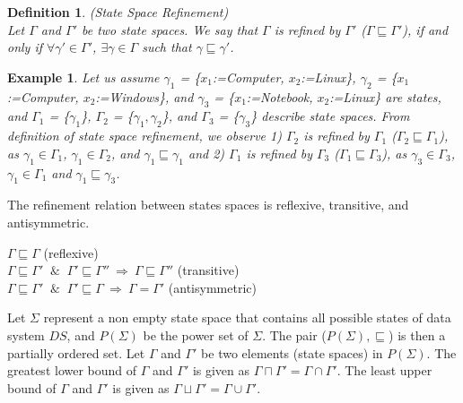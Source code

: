 \documentclass[12pt,journal,letterpaper,onecolumn]{IEEEtran}
\newtheorem{definition}{Definition}[section]
\newtheorem{example}{Example}[section]
\begin{document}
\begin{definition}(State Space Refinement)\\
Let $\Gamma$ and $\Gamma'$ be two state spaces. We say that $\Gamma$
is refined by $\Gamma'$ ($\Gamma \sqsubseteq \Gamma'$), if and only
if $\forall \gamma' \in \Gamma'$,  $\exists \gamma \in \Gamma$
such that $\gamma \sqsubseteq \gamma'$.
\label{def:statespacerefinement}
\end{definition}


\begin{example}
Let us assume $\gamma_1$ = \{$x_1$:={\ttfamily Computer}, $x_2$:={\ttfamily Linux}\},
     $\gamma_2$ = \{$x_1$:={\ttfamily Computer}, $x_2$:={\ttfamily Windows}\}, and
     $\gamma_3$ = \{$x_1$:={\ttfamily Notebook}, $x_2$:={\ttfamily Linux}\} are states, and $\Gamma_1$ = \{$\gamma_1$\},
     $\Gamma_2$ = \{$\gamma_1, \gamma_2$\}, and
     $\Gamma_3$ = \{$\gamma_3$\} describe state spaces.
From definition of state space refinement, we observe
1) $\Gamma_2$ is refined by $\Gamma_1$ ($\Gamma_2 \sqsubseteq \Gamma_1$), as $\gamma_1 \in \Gamma_1$, $\gamma_1 \in \Gamma_2$, and $\gamma_1 \sqsubseteq \gamma_1$ and 2) $\Gamma_1$ is refined by $\Gamma_3$ ($\Gamma_1 \sqsubseteq \Gamma_3$), as $\gamma_3 \in \Gamma_3$, $\gamma_1 \in \Gamma_1$ and $\gamma_1 \sqsubseteq \gamma_3$.
\label{eg:statespaceref}
\end{example}



The refinement relation between states spaces is reflexive,
transitive, and antisymmetric.
\begin{center}
\begin{minipage}{4.5in}
$\Gamma \sqsubseteq \Gamma$  (reflexive) \\
$\Gamma \sqsubseteq \Gamma' $ $~\&~$ $ \Gamma' \sqsubseteq \Gamma''
~\Rightarrow~ \Gamma \sqsubseteq \Gamma''$ (transitive)\\
$\Gamma \sqsubseteq \Gamma' $ $~\&~$ $ \Gamma' \sqsubseteq \Gamma
~\Rightarrow~ \Gamma = \Gamma'$ (antisymmetric)
\end{minipage}
\end{center}

Let $\Sigma$ represent a non empty state space that contains all
possible states of data system $DS$, and $P(\Sigma)$ be the power set
of $\Sigma$. The pair ($P(\Sigma),\sqsubseteq$) is then a partially
ordered set. Let $\Gamma$ and $\Gamma'$ be two elements (state
spaces) in $P(\Sigma)$. The greatest lower bound of $\Gamma$ and
$\Gamma'$ is given as $\Gamma \sqcap \Gamma' = \Gamma \cap \Gamma'$.
The least upper bound of $\Gamma$ and $\Gamma'$ is given as $\Gamma
\sqcup \Gamma' = \Gamma \cup \Gamma'$.
\end{document}
